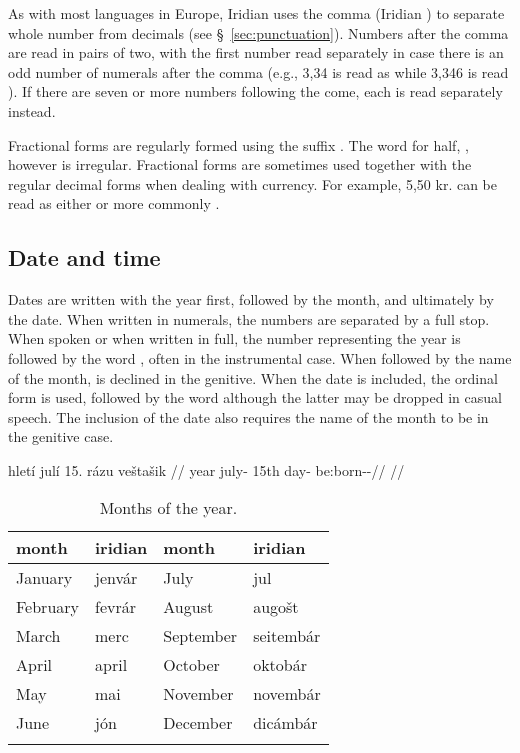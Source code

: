 As with most languages in Europe, Iridian uses the comma (Iridian ) to separate whole number from decimals (see \S~\ref{sec:punctuation}). Numbers after the comma are read in pairs of two, with the first number read separately in case there is an odd number of numerals after the comma (e.g., 3,34 is read as  while 3,346 is read ). If there are seven or more numbers following the come, each is read separately instead.

Fractional forms are regularly formed using the suffix . The word for half, , however is irregular. Fractional forms are sometimes used together with the regular decimal forms when dealing with currency. For example, 5,50 kr. can be read as either  or more commonly .

\subsection{Date and time}
Dates are written with the year first, followed by the month, and ultimately by the date. When written in numerals, the numbers are separated by a full stop. When spoken or when written in full, the number representing the year is followed by the word , often in the instrumental case. When followed by the name of the month,  is declined in the genitive. When the date is included, the ordinal form is used, followed by the word  although the latter may be dropped in casual speech. The inclusion of the date also requires the name of the month to be in the genitive case.

\pex
\a
\begingl
     hletí julí 15. rázu veštašik //
     year july-\Gen{} 15th day-\Ins{} be:born-\Av{}-\Pf{}//
    \glft {}//
\endgl
\xe

\begin{table}[h!]
	\caption{Months of the year.}
	\medskip
	\small
	\begin{tabu}to 0.7 \textwidth {YYYY}
		\toprule
		{\sc month} & {\sc iridian} & {\sc month} & {\sc iridian}\\
		\midrule
		January		& jenvár	& July & jul\\
		February	& fevrár 	& August & augošt\\
		March		& merc		& September & seitembár\\
		April		& april 	& October & oktobár\\
		May 		& mai 		& November & novembár\\
		June 		& jón 	& December & dicámbár\\
		\bottomrule
		\label{30992}
	\end{tabu}
\end{table}

